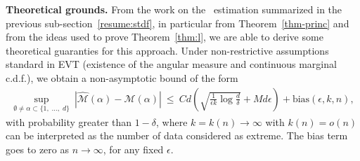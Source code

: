 \textbf{Theoretical grounds.}
From the work on the \stdf~estimation summarized in the previous sub-section~\ref{resume:stdf}, in particular from Theorem~\ref{thm-princ} and from the ideas used to prove Theorem~\ref{thm:l}, we are able to derive some theoretical guaranties for this approach.
%
Under non-restrictive assumptions standard in EVT (existence of the angular measure and continuous marginal c.d.f.), we obtain a non-asymptotic bound of the form
\begin{align*}
\sup_{\emptyset \neq \alpha \subset \{1,\; \ldots,\; d \}}~ |\widehat{\mathcal{M}}(\alpha)- \mathcal{M}(\alpha)|
~\le~  C d \left( \sqrt{ \frac{1}{\epsilon k}\log\frac{d}{\delta}} + M d\epsilon \right) + \text{bias}(\epsilon, k, n),
\end{align*}
with probability greater than $1-\delta$, where $k = k(n) \to \infty$ with $k(n) = o(n)$ can be interpreted as the number of data considered as extreme. 
The bias term goes to zero as $n \to \infty$, for any fixed $\epsilon$.




